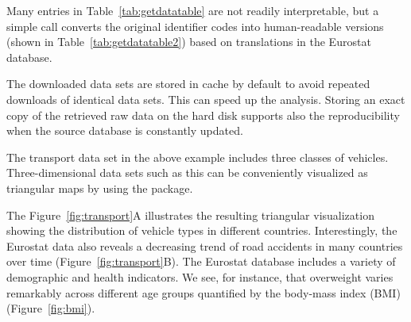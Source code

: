 Many entries in Table~\ref{tab:getdatatable} are not readily
interpretable, but a simple call  converts
the original identifier codes into human-readable versions (shown in
Table~\ref{tab:getdatatable2}) based on translations in the Eurostat
database.

The downloaded data sets are stored in cache by default to avoid
repeated downloads of identical data sets. This can speed up the
analysis. Storing an exact copy of the retrieved raw data on the hard
disk supports also the reproducibility when the source database is
constantly updated.

The transport data set in the above example includes three classes of
vehicles. Three-dimensional data sets such as this can be conveniently
visualized as triangular maps by using
the  \citep{plotrix} package.


The Figure~\ref{fig:transport}A illustrates the resulting triangular
visualization showing the distribution of vehicle types in different
countries. Interestingly, the Eurostat data also reveals a decreasing
trend of road accidents in many countries over time
(Figure~\ref{fig:transport}B). The Eurostat database includes a
variety of demographic and health indicators. We see, for instance,
that overweight varies remarkably across different age groups
quantified by the body-mass index (BMI) (Figure~\ref{fig:bmi}).


